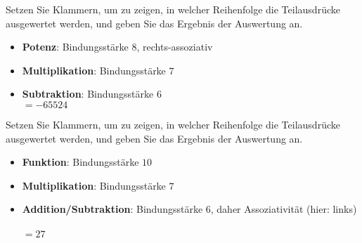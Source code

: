 \begin{frame}\onslide<+->%
    \begin{exercise}
        Setzen Sie Klammern, um zu zeigen, in welcher Reihenfolge die Teilausdrücke ausgewertet werden, und geben Sie das Ergebnis der Auswertung an.
    \end{exercise}
    \begin{solve}
    \begin{itemize}
        \item<+-> \textbf{Potenz}: Bindungsstärke $8$, rechts-assoziativ\hfill{}
        \item<+-> \textbf{Multiplikation}: Bindungsstärke $7$\hfill{}
        \item<+-> \textbf{Subtraktion}: Bindungsstärke $6$\hfill{}\\
        \onslide<+->\hfill$= -65524$
    \end{itemize}
    \end{solve}
\end{frame}
\addtocounter{exercise}{-1}\addtocounter{solve}{-1}%
\begin{frame}\onslide<+->%
    \begin{exercise}
        Setzen Sie Klammern, um zu zeigen, in welcher Reihenfolge die Teilausdrücke ausgewertet werden, und geben Sie das Ergebnis der Auswertung an.
    \end{exercise}
    \begin{solve}
    \begin{itemize}
        \item<+-> \textbf{Funktion}: Bindungsstärke $10$\hfill{}
        \item<+-> \textbf{Multiplikation}: Bindungsstärke $7$\hfill{}
        \item<+-> \textbf{Addition/Subtraktion}: Bindungsstärke $6$, daher Assoziativität (hier: links)\\\hfill{}\\
        \onslide<+->\hfill$= 27$
    \end{itemize}
    \end{solve}
\end{frame}